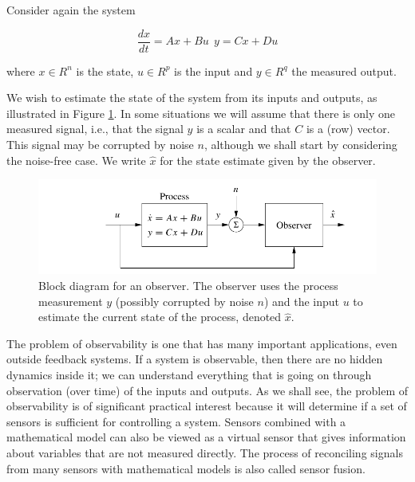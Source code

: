 Consider again the system

\begin{equation}
\frac{dx}{dt} = Ax + Bu ~~ y = Cx + Du
\end{equation}


where $x\in R^n$ is the state, $u\in R^{p}$ is the input and $y\in R^q$ the measured output.

We wish to estimate the state of the system from its inputs and outputs, as illustrated
in Figure \ref{observer_block_diagram}. In some situations we will assume that there is only one measured
signal, i.e., that the signal $y$ is a scalar and that $C$ is a (row) vector. This signal may
be corrupted by noise $n$, although we shall start by considering the noise-free case.
We write $\hat{x}$ for the state estimate given by the observer.

\begin{figure}[!htb]
\begin{center}
\includegraphics[scale=0.380]{img/output_feedback/observer_block_diagram.jpeg}
\end{center}
\caption{Block diagram for an observer. The observer uses the process measurement $y$
(possibly corrupted by noise $n$) and the input $u$ to estimate the current state of the process,
denoted $\hat{x}$.}
\label{observer_block_diagram}
\end{figure}


The problem of observability is one that has many important applications, even
outside feedback systems. If a system is observable, then there are no hidden dynamics inside it; we can understand everything that is going on through observation (over time) of the inputs and outputs. As we shall see, the problem of observability is of significant practical interest because it will determine if a set of sensors is
sufficient for controlling a system. Sensors combined with a mathematical model
can also be viewed as a virtual sensor that gives information about variables that
are not measured directly. The process of reconciling signals from many sensors
with mathematical models is also called sensor fusion.



